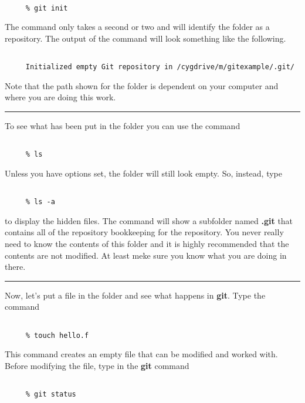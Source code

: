 \documentclass[10pt,fleqn]{article}
\begin{document}
\begin{verbatim}

     % git init

\end{verbatim}
The command only takes a second or two and will identify the folder as a
repository. The output of the command will look something like the following.
\begin{verbatim}

     Initialized empty Git repository in /cygdrive/m/gitexample/.git/

\end{verbatim}
Note that the path shown for the folder is dependent on your computer and where
you are doing this work.
\vskip0.1in\hrule\vskip0.1in
\noindent
To see what has been put in the folder you can use the command
\begin{verbatim}

     % ls

\end{verbatim}
Unless you have options set, the folder will still look empty. So, instead, type
\begin{verbatim}

     % ls -a

\end{verbatim}
to display the hidden files. The command will show a subfolder named {\bf .git}
that contains all of the repository bookkeeping for the repository. You never
really need to know the contents of this folder and it is highly recommended
that the contents are not modified. At least meke sure you know what you are
doing in there.
\vskip0.1in\hrule\vskip0.1in
\noindent
Now, let's put a file in the folder and see what happens in {\bf git}. Type the
command
\begin{verbatim}

     % touch hello.f

\end{verbatim}
This command creates an empty file that can be modified and worked with. Before
modifying the file, type in the {\bf git} command
\begin{verbatim}

     % git status

\end{verbatim}
\end{document}
